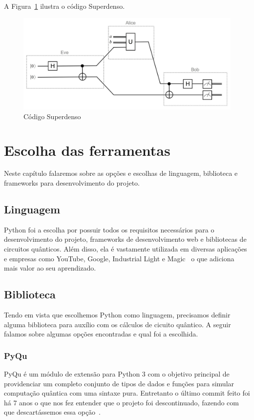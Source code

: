 \documentclass[a4paper, 12pt, oneside]{book}
\begin{document}
A Figura~\ref{fig:superdense} ilustra o código Superdenso.
\begin{figure}[H]
\centering
\includegraphics[scale=0.38]{superdenso.jpg}
\caption{Código Superdenso}
\label{fig:superdense}
\end{figure}


\chapter{Escolha das ferramentas}
\thispagestyle{empty} 


Neste capítulo falaremos sobre as opções e escolhas de linguagem, biblioteca e frameworks para desenvolvimento do projeto. 

\section{Linguagem}

Python foi a escolha por possuir todos os requisitos necessários para o desenvolvimento do projeto, frameworks de desenvolvimento web e bibliotecas de circuitos quânticos. Além disso, ela é vastamente utilizada em diversas aplicações e empresas como YouTube, Google, Industrial Light e Magic~\cite{pythonquotes} o que adiciona mais valor ao seu aprendizado.

\section{Biblioteca}

Tendo em vista que escolhemos Python como linguagem, precisamos definir alguma biblioteca para auxílio com os cálculos de cicuito quântico. A seguir falamos sobre algumas opções encontradas e qual foi a escolhida.
\subsection{PyQu}
PyQu é um módulo de extensão para Python 3 com o objetivo principal de providenciar um completo conjunto de tipos de dados e funções para simular computação quântica com uma sintaxe pura. Entretanto o último commit feito foi há 7 anos o que nos fez entender que o projeto foi descontinuado, fazendo com que descartássemos essa opção~\cite{pyqu}.
\end{document}
